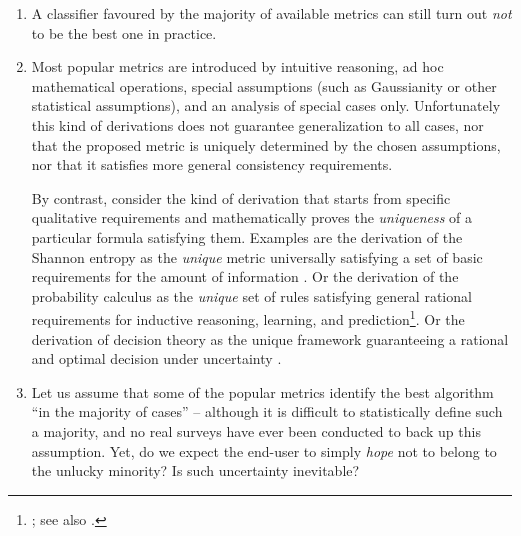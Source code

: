 \documentclass[\ifafour a4paper,12pt,\else a5paper,10pt,\fi%
onecolumn,oneside,article,%
british%
]{memoir}
\theoremstyle{remark}
\theoremstyle{innote}
\renewcommand*{\|}[1][]{\nonscript\:#1\vert\nonscript\:\mathopen{}}
\newcommand*{\sect}{\S}%
\newcommand*{\chap}{ch.}%
\newcommand*{\chaps}{chs}%
\begin{document}
\begin{enumerate}
\item A classifier favoured by the majority of available metrics can still turn out \emph{not} to be the best one in practice.

\item\label{item:ad_hoc} Most popular metrics are introduced by intuitive reasoning, ad hoc mathematical operations, special assumptions (such as Gaussianity\autocites[e.g.][\sect~31 p.~183 for the Matthews correlation coefficient]{fisher1925_r1963} or other statistical assumptions), and an analysis of special cases only. Unfortunately this kind of derivations does not guarantee generalization to all cases, nor that the proposed metric is uniquely determined by the chosen assumptions, nor that it satisfies more general consistency requirements.

  By contrast, consider the kind of derivation that starts from specific qualitative requirements and mathematically proves the \emph{uniqueness} of a particular formula satisfying them. Examples are the derivation of the Shannon entropy  as the \emph{unique} metric universally satisfying a set of basic requirements for the amount of information \autocites{shannon1948}[\sect~3.2]{woodward1953_r1964}[also][]{goodetal1968}. Or  the derivation  of the probability calculus as the \emph{unique} set of rules satisfying general rational requirements for inductive reasoning, learning, and prediction\footnote{\cites{cox1946,fine1973,halpern1999b,snow1998,snow2001}[\chaps~1--2]{jaynes1994_r2003}; see also \cites{selfetal1987,cheeseman1988}[\chap~12]{russelletal1995_r2022}.}.
Or the derivation of decision theory as the unique framework guaranteeing a rational and optimal decision under uncertainty \autocites[\sect~15.2]{russelletal1995_r2022}[\chaps~2--3]{vonneumannetal1944_r1955}.
  
\item\label{item:hope_medical} Let us assume that some of the popular metrics identify the best algorithm \enquote{in the majority of cases} -- although it is difficult to statistically define such a majority, and no real surveys have ever been conducted to back up this assumption. Yet, do we expect the end-user to simply \emph{hope} not to belong to the unlucky minority? Is such uncertainty inevitable?


\end{enumerate}
\end{document}
